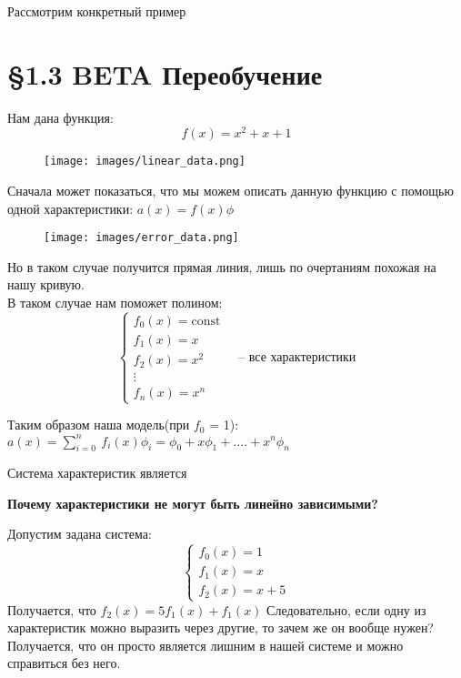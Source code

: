 Рассмотрим конкретный пример


\centering
\section*{\S 1.3 BETA Переобучение}
\vspace{0.8cm}
\raggedright

Нам дана функция:
\[
    f(x) = x^2 + x + 1
\]
\begin{figure}[htbp]
        \texttt{[image: images/linear\_data.png]}
        \label{fig:example}
    \end{figure}

Сначала может показаться, что мы можем описать данную функцию с
помощью одной характеристики: \(a(x) = f(x) \phi\)\\
\begin{figure}[htbp]
        \texttt{[image: images/error\_data.png]}
        \label{fig:example}
    \end{figure}
Но в таком случае получится прямая линия, лишь по очертаниям похожая на нашу кривую. \\
\vspace{0.7cm}
В таком случае нам поможет полином: \[
\begin{cases}
    f_0(x) = \text{const} \\
    f_1(x) = x \\
    f_2(x) = x^2 \\
    \vdots \\
    f_n(x) = x^n
\end{cases}
\quad \textbf{-- все характеристики}
\]


Таким образом наша модель(при \(f_{0}\) = 1): \(a(x) = \sum_{i = 0}^n\ f_i(x) \phi_i =
\phi_0 + x\phi_1 + .... + x^n \phi_n\) \\
\begin{tcolorbox}[colback=gray!10, colframe=black, title=Важно]
    Система характеристик является  \\
\end{tcolorbox}

\textbf{Почему характеристики не могут быть линейно зависимыми?} \\
\vspace{0.5cm}

Допустим задана система:
\[
    \begin{cases}
        f_0(x) = 1 \\
        f_1(x) = x \\
        f_2(x) = x+5
    \end{cases}
\]
Получается, что \(f_2(x) = 5f_1(x) + f_1(x)\)
Следовательно, если одну из характеристик можно выразить через другие, то зачем же  он вообще нужен? Получается, что
он просто является лишним в нашей системе и можно справиться без него.

